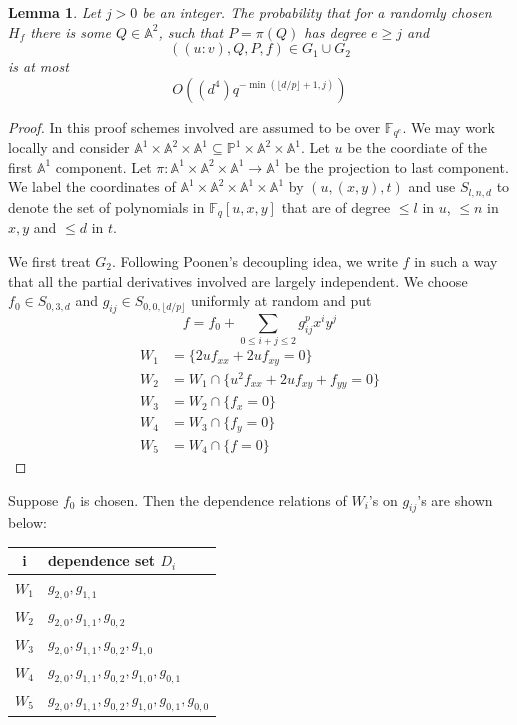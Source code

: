 \documentclass[12pt]{article}
\theoremstyle{plain}
\newtheorem{lemma}[equation]{Lemma}
\theoremstyle{definition}
\newcommand{\IA}{\mathbb{A}}
\newcommand{\IF}{\mathbb{F}}
\newcommand{\IP}{\mathbb{P}}
\newcommand{\Spec}{\rm Spec\,}
\newcommand{\<}{\langle}
\renewcommand{\>}{\rangle}
\newcommand{\fl}[1]{\lfloor #1 \rfloor}
\begin{document}
\begin{lemma}
\label{projection}
Let $j > 0$ be an integer. The probability that for a randomly chosen $H_f$ there is some $Q \in \IA^2$, such that $P = \pi(Q)$ has degree $e \ge j$ and  
$$ ((u : v), Q, P, f) \in G_1 \cup G_2 $$
is at most 
$$ O((d^4) q^{-\min(\fl{d/p} + 1, j)})$$
\end{lemma}
\begin{proof}
In this proof schemes involved are assumed to be over $\IF_{q^e}$. We may work locally and consider $\IA^1 \times \IA^2 \times \IA^1 \subseteq \IP^1 \times \IA^2 \times \IA^1$. Let $u$ be the coordiate of the first $\IA^1$ component. Let $\pi : \IA^1 \times \IA^2 \times \IA^1 \to \IA^1$ be the projection to last component. We label the coordinates of $\IA^1 \times \IA^2 \times \IA^1 \times \IA^1$ by $(u, (x, y), t)$ and use $S_{l, n, d}$ to denote the set of polynomials in $\IF_q[u, x, y]$ that are of degree $\le l$ in $u$, $\le n$ in $x, y$ and $\le d$ in $t$. 

We first treat $G_2$. Following Poonen's decoupling idea, we write $f$ in such a way that all the partial derivatives involved are largely independent. We choose $f_0 \in S_{0, 3, d}$ and $g_{ij} \in S_{0, 0, \fl{d/p}}$ uniformly at random and put 
$$ f = f_0 + \sum_{0 \le i + j \le 2} g_{ij}^p x^i y^j$$
\begin{align*}
W_1 &= \{ 2u f_{xx} + 2u f_{xy} = 0 \}\\
W_2 &= W_1 \cap \{u^2 f_{xx} + 2u f_{xy} + f_{yy} = 0\}\\
W_3 &= W_2 \cap \{ f_x = 0 \} \\
W_4 &= W_3 \cap \{ f_y = 0 \} \\
W_5 &= W_4 \cap \{ f = 0 \}
\end{align*}
\end{proof}
Suppose $f_0$ is chosen. Then the dependence relations of $W_i$'s on $g_{ij}$'s are shown below:
\begin{center}
\begin{tabular}{|c | l |}
\hline
i & dependence set $D_i$ \\ \hline
$W_1$ & $g_{2, 0}, g_{1, 1}$ \\ \hline
$W_2$ & $g_{2, 0}, g_{1, 1}, g_{0, 2}$ \\ \hline
$W_3$ & $g_{2, 0}, g_{1, 1}, g_{0, 2}, g_{1, 0}$ \\ \hline
$W_4$ & $g_{2, 0}, g_{1, 1}, g_{0, 2}, g_{1, 0}, g_{0, 1}$ \\ \hline
$W_5$ & $g_{2, 0}, g_{1, 1}, g_{0, 2}, g_{1, 0}, g_{0, 1}, g_{0, 0}$ \\ \hline
\end{tabular}
\end{center}
\end{document}

